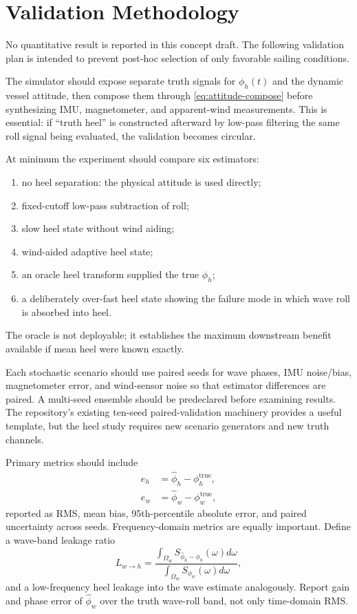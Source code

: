 \documentclass[conference]{IEEEtran}
\begin{document}
\section{Validation Methodology}
\label{sec:validation}

No quantitative result is reported in this concept draft. The following validation plan
is intended to prevent post-hoc selection of only favorable sailing conditions.

The simulator should expose separate truth signals for $\phi_h(t)$ and the dynamic vessel
attitude, then compose them through \eqref{eq:attitude-compose} before synthesizing IMU,
magnetometer, and apparent-wind measurements. This is essential: if ``truth heel'' is
constructed afterward by low-pass filtering the same roll signal being evaluated, the
validation becomes circular.

At minimum the experiment should compare six estimators:
\begin{enumerate}
 \item no heel separation: the physical attitude is used directly;
 \item fixed-cutoff low-pass subtraction of roll;
 \item slow heel state without wind aiding;
 \item wind-aided adaptive heel state;
 \item an oracle heel transform supplied the true $\phi_h$;
 \item a deliberately over-fast heel state showing the failure mode in which wave roll is absorbed into heel.
\end{enumerate}
The oracle is not deployable; it establishes the maximum downstream benefit available if
mean heel were known exactly.

Each stochastic scenario should use paired seeds for wave phases, IMU noise/bias,
magnetometer error, and wind-sensor noise so that estimator differences are paired. A
multi-seed ensemble should be predeclared before examining results. The repository's
existing ten-seed paired-validation machinery provides a useful template, but the heel
study requires new scenario generators and new truth channels.

Primary metrics should include
\begin{align}
 e_h &= \hat\phi_h-\phi_h^{\mathrm{true}},\\
 e_w &= \hat\phi_w-\phi_w^{\mathrm{true}},
 \label{eq:errors}
\end{align}
reported as RMS, mean bias, 95th-percentile absolute error, and paired uncertainty across
seeds. Frequency-domain metrics are equally important. Define a wave-band leakage ratio
\begin{equation}
 L_{w\rightarrow h}=
 \frac{\int_{\Omega_w}S_{\hat\phi_h-\phi_h}(\omega)d\omega}
      {\int_{\Omega_w}S_{\phi_w}(\omega)d\omega},
 \label{eq:wave-to-heel-leak}
\end{equation}
and a low-frequency heel leakage into the wave estimate analogously. Report gain and
phase error of $\hat\phi_w$ over the truth wave-roll band, not only time-domain RMS.
\end{document}
